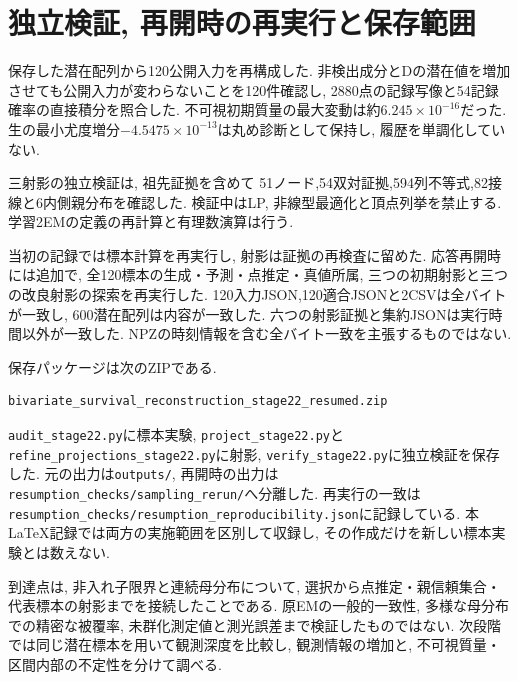 \section{独立検証, 再開時の再実行と保存範囲}
\label{sec:stage22_record}

保存した潜在配列から120公開入力を再構成した.
非検出成分とDの潜在値を増加させても公開入力が変わらないことを120件確認し,
2880点の記録写像と54記録確率の直接積分を照合した.
不可視初期質量の最大変動は約$6.245\times10^{-16}$だった.
生の最小尤度増分$-4.5475\times10^{-13}$は丸め診断として保持し,
履歴を単調化していない.

三射影の独立検証は, 祖先証拠を含めて
51ノード,54双対証拠,594列不等式,82接線と6内側親分布を確認した.
検証中はLP, 非線型最適化と頂点列挙を禁止する.
学習2EMの定義の再計算と有理数演算は行う.

当初の記録では標本計算を再実行し, 射影は証拠の再検査に留めた.
応答再開時には追加で, 全120標本の生成・予測・点推定・真値所属,
三つの初期射影と三つの改良射影の探索を再実行した.
120入力JSON,120適合JSONと2CSVは全バイトが一致し,
600潜在配列は内容が一致した.
六つの射影証拠と集約JSONは実行時間以外が一致した.
NPZの時刻情報を含む全バイト一致を主張するものではない.

保存パッケージは次のZIPである.
\begin{verbatim}
bivariate_survival_reconstruction_stage22_resumed.zip
\end{verbatim}
\texttt{audit\_stage22.py}に標本実験,
\texttt{project\_stage22.py}と\texttt{refine\_projections\_stage22.py}に射影,
\texttt{verify\_stage22.py}に独立検証を保存した.
元の出力は\texttt{outputs/}, 再開時の出力は
\nolinkurl{resumption_checks/sampling_rerun/}へ分離した.
再実行の一致は
\nolinkurl{resumption_checks/resumption_reproducibility.json}に記録している.
本LaTeX記録では両方の実施範囲を区別して収録し,
その作成だけを新しい標本実験とは数えない.

到達点は, 非入れ子限界と連続母分布について,
選択から点推定・親信頼集合・代表標本の射影までを接続したことである.
原EMの一般的一致性, 多様な母分布での精密な被覆率,
未群化測定値と測光誤差まで検証したものではない.
次段階では同じ潜在標本を用いて観測深度を比較し,
観測情報の増加と, 不可視質量・区間内部の不定性を分けて調べる.
